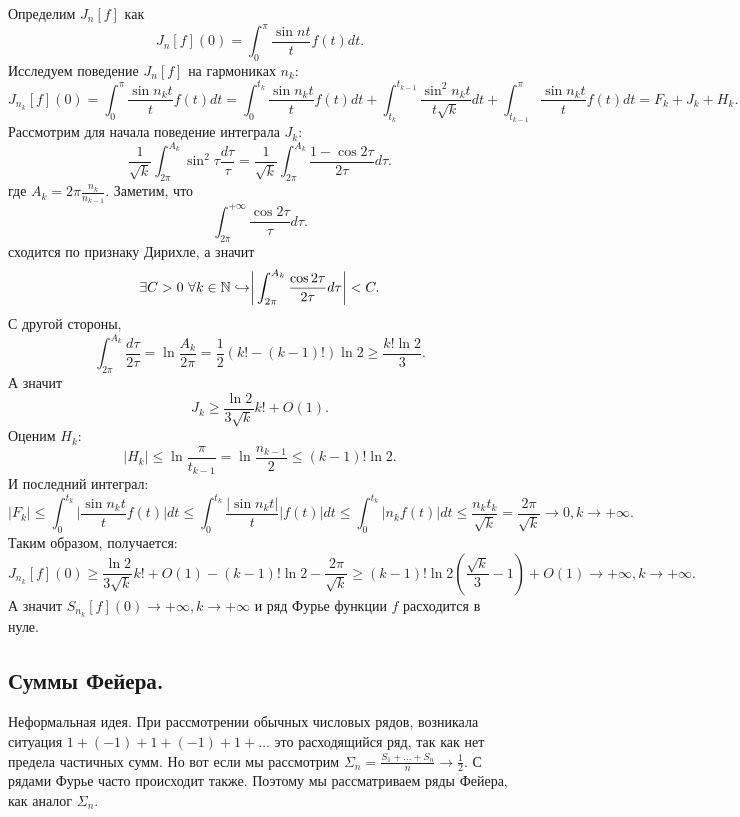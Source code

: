 \begin{example}[Шварц]
    Определим $J_n[f]$ как \[
                                                                                                  J_n[f](0) = \int_0^\pi \dfrac{\sin nt}{t}f(t)dt.
    \]
    Исследуем поведение $J_n[f]$ на гармониках $n_k$:
    \[
        J_{n_k}[f](0) = \int_0^\pi \dfrac{\sin n_kt}{t}f(t)dt = \int_0^{t_k}\dfrac{\sin n_kt }{t}f(t)dt + \int_{t_k}^{t_{k - 1}}\dfrac{\sin^2 n_kt}{t \sqrt{k}}dt + \int_{t_{k - 1}}^\pi \dfrac{\sin n_kt}{t}f(t)dt = F_k + J_k + H_k.
    \]
    Рассмотрим для начала поведение интеграла $J_k$:
    \[
        \dfrac{1}{\sqrt{k}}\int_{2\pi}^{A_k}\sin^2 \tau \dfrac{d\tau}{\tau} = \dfrac{1}{\sqrt{k}}\int_{2\pi}^{A_k}\dfrac{1 - \cos 2\tau}{2\tau}d\tau.
    \]
    где $A_k = 2\pi \frac{n_k}{n_{k - 1}}$. Заметим, что \[
                                                             \int_{2\pi}^{+\infty}\dfrac{\cos 2\tau}{\tau}d\tau.
    \]
    сходится по признаку Дирихле, а значит \[
                                               \exists C > 0 \ \forall k \in \mathbb{N} \hookrightarrow \biggr|\int_{2\pi}^{A_k} \dfrac{\cos 2\tau}{2\tau}d\tau\biggr| < C.
    \]
    С другой стороны, \[
                          \int_{2\pi}^{A_k} \dfrac{d\tau}{2\tau} = \ln \dfrac{A_k}{2\pi} = \dfrac{1}{2}(k! - (k - 1)!)\ln 2 \geq \dfrac{k! \ln 2}{3}.
    \]
    А значит \[
                 J_k \geq \dfrac{\ln 2}{3\sqrt{k}}k! + O(1).
    \]
    Оценим $H_k$: \[
                      |H_k| \leq \ln \dfrac{\pi}{t_{k - 1}} = \ln \dfrac{n_{k - 1}}{2} \leq (k - 1)!\ln 2.
    \]
    И последний интеграл: \[
                              |F_k| \leq \int_0^{t_k} \biggr|\dfrac{\sin n_kt}{t}f(t)\biggr|dt \leq \int_0^{t_{k}}\dfrac{|\sin n_kt|}{t}|f(t)|dt \leq \int_0^{t_k}|n_kf(t)|dt \leq \dfrac{n_k t_k}{\sqrt{k}} = \dfrac{2\pi}{\sqrt{k}} \rightarrow 0, k \rightarrow +\infty.
    \]
    Таким образом, получается: \[
                                   J_{n_k}[f](0) \geq \dfrac{\ln 2}{3\sqrt{k}}k! + O(1) - (k - 1)!\ln 2 - \dfrac{2\pi }{\sqrt{k}} \geq (k - 1)!\ln 2(\dfrac{\sqrt{k}}{3} - 1) + O(1) \rightarrow +\infty, k \rightarrow +\infty.
    \]
    А значит $S_{n_k}[f](0) \rightarrow +\infty, k \rightarrow +\infty$ и ряд Фурье функции $f$ расходится в нуле.
\end{example}
\subsection{Суммы Фейера.}
Неформальная идея. При рассмотрении обычных числовых рядов, возникала ситуация $1 + (-1) + 1 + (-1) + 1  + \dots$ это расходящийся ряд, так как нет предела частичных сумм. Но вот если мы рассмотрим $\Sigma_n = \frac{S_1 +\dots +S_n}{n} \to \frac{1}{2}$. С рядами Фурье часто происходит также. Поэтому мы рассматриваем ряды Фейера, как аналог $\Sigma_n$.


